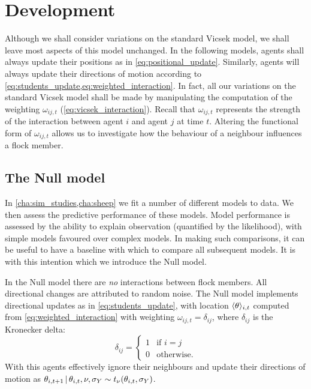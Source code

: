 \section{Development}

Although we shall consider variations on the standard Vicsek model, we shall
leave most aspects of this model unchanged. In the following models, agents
shall always update their positions as in \cref{eq:positional_update}.
Similarly, agents will always update their directions of motion according to
\cref{eq:students_update,eq:weighted_interaction}. In fact, all our variations
on the standard Vicsek model shall be made by manipulating the computation of
the weighting $\omega_{ij,t}$ (\cref{eq:vicsek_interaction}). Recall that
$\omega_{ij,t}$ represents the strength of the interaction between agent $i$
and agent $j$ at time $t$. Altering the functional form of $\omega_{ij,t}$
allows us to investigate how the behaviour of a neighbour influences a flock
member.

\subsection{The Null model}
\label{sec:null_model}

In \cref{cha:sim_studies,cha:sheep} we fit a number of different models to
data. We then assess the predictive performance of these models. Model
performance is assessed by the ability to explain observation (quantified by
the likelihood), with simple models favoured over complex models. In making
such comparisons, it can be useful to have a baseline with which to compare all
subsequent models. It is with this intention which we introduce the Null model.

In the Null model there are \emph{no} interactions between flock members. All
directional changes are attributed to random noise. The Null model implements
directional updates as in \cref{eq:students_update}, with location
$\langle\theta\rangle_{i,t}$ computed from \cref{eq:weighted_interaction} with
weighting $\omega_{ij,t}=\delta_{ij}$, where $\delta_{ij}$ is the Kronecker
delta:
\begin{equation*}
  \delta_{ij} =
  \begin{cases}
    1 & \text{if } i=j \\
    0 & \text{otherwise.}
  \end{cases}
\end{equation*}
With this agents effectively ignore their neighbours and update their
directions of motion as $\theta_{i,t+1} \,|\, \theta_{i,t}, \nu, \sigma_Y \sim
t_\nu(\theta_{i,t}, \sigma_Y)$.

